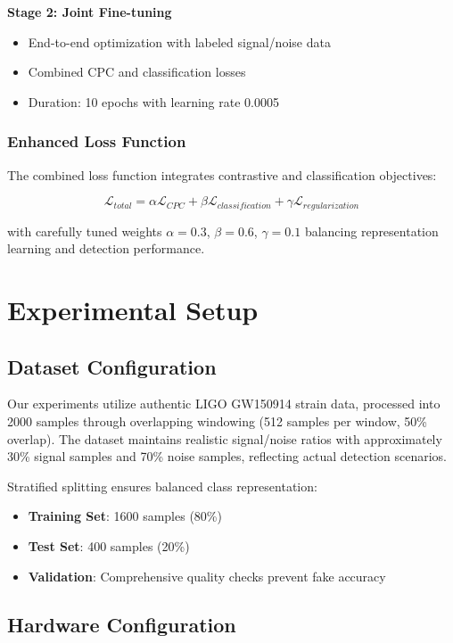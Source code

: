 \documentclass[12pt,a4paper]{article}
\begin{document}
\textbf{Stage 2: Joint Fine-tuning}
\begin{itemize}
\item End-to-end optimization with labeled signal/noise data
\item Combined CPC and classification losses
\item Duration: 10 epochs with learning rate 0.0005
\end{itemize}

\subsubsection{Enhanced Loss Function}

The combined loss function integrates contrastive and classification objectives:

\begin{equation}
\mathcal{L}_{total} = \alpha \mathcal{L}_{CPC} + \beta \mathcal{L}_{classification} + \gamma \mathcal{L}_{regularization}
\end{equation}

with carefully tuned weights $\alpha=0.3$, $\beta=0.6$, $\gamma=0.1$ balancing representation learning and detection performance.

\section{Experimental Setup}

\subsection{Dataset Configuration}

Our experiments utilize authentic LIGO GW150914 strain data, processed into 2000 samples through overlapping windowing (512 samples per window, 50\% overlap). The dataset maintains realistic signal/noise ratios with approximately 30\% signal samples and 70\% noise samples, reflecting actual detection scenarios.

Stratified splitting ensures balanced class representation:
\begin{itemize}
\item \textbf{Training Set}: 1600 samples (80\%)
\item \textbf{Test Set}: 400 samples (20\%)
\item \textbf{Validation}: Comprehensive quality checks prevent fake accuracy
\end{itemize}

\subsection{Hardware Configuration}
\end{document}

